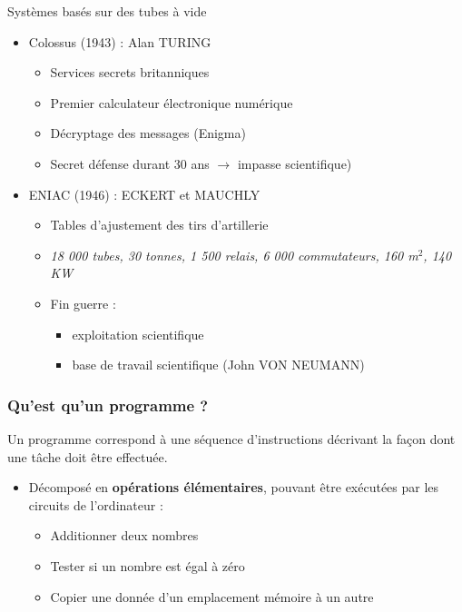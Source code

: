 \begin{frame}{Systèmes basés sur des tubes à vide}
\begin{itemize}
\item<1> Colossus (1943) : Alan TURING
\begin{itemize}
\item Services secrets britanniques
\item Premier calculateur électronique numérique
\item Décryptage des messages (Enigma)
\item Secret défense durant 30 ans $\rightarrow$ impasse scientifique)
\end{itemize}
\item<2> ENIAC (1946) : ECKERT et MAUCHLY
\begin{itemize}
\item Tables d'ajustement des tirs d'artillerie
\item \textit{18 000 tubes, 30 tonnes, 1 500 relais, 6 000 commutateurs, 160 m$^2$, 140 KW}
\item Fin guerre :
\begin{itemize}
\item exploitation scientifique
\item base de travail scientifique (John VON NEUMANN)
\end{itemize}
\end{itemize}
\end{itemize}
\end{frame}

\begin{frame}
\frametitle{Qu'est qu'un programme ?}
\begin{definition}
Un programme correspond à une séquence d'instructions décrivant la façon dont une tâche doit être effectuée. \cite{tanen}
\end{definition}
\begin{itemize}
\item Décomposé en \textbf{opérations élémentaires}, pouvant être exécutées par les circuits de l'ordinateur :
\begin{itemize}
\item Additionner deux nombres
\item Tester si un nombre est égal à zéro
\item Copier une donnée d'un emplacement mémoire à un autre
\end{itemize}
\end{itemize}
\end{frame}


